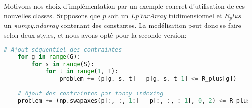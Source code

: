 Motivons nos choix d'implémentation par un exemple concret d'utilisation de ces nouvelles classes.
Supposons que $p$ soit un \textit{LpVarArray} tridimensionnel et $R_plus$ un \textit{numpy.ndarray} contenant 
des constantes. La modélisation peut donc se faire selon deux styles, et nous avons opté pour la seconde
version:
\begin{lstlisting}[language=Python]
    # Ajout séquentiel des contraintes
    for g in range(G):
        for s in range(S):
            for t in range(1, T):
                problem += (p[g, s, t] - p[g, s, t-1] <= R_plus[g])

    # Ajout des contraintes par fancy indexing
    problem += (np.swapaxes(p[:, :, 1:] - p[:, :, :-1], 0, 2) <= R_plus)
\end{lstlisting}